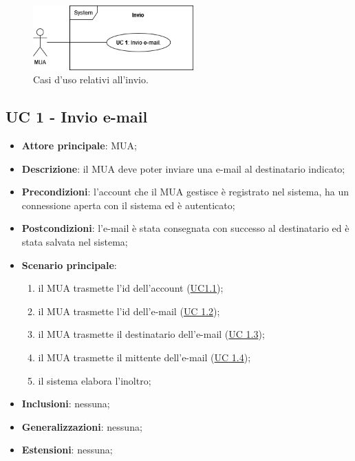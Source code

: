 
\begin{figure}[H]
    \includegraphics[width=0.55\textwidth]{sections/uc_imgs/UC-invio.png}
    \centering
    \caption{Casi d'uso relativi all'invio.}
\end{figure}

\subsection{UC 1 - Invio e-mail} \label{sec:UC1}
    
    \begin{itemize}
        \item \textbf{Attore principale}: MUA;
        \item \textbf{Descrizione}: il MUA deve poter inviare una e-mail al destinatario indicato;
        \item \textbf{Precondizioni}: l’account che il MUA gestisce è registrato nel sistema, ha un connessione aperta con il sistema ed è autenticato;
        \item \textbf{Postcondizioni}: l'e-mail è stata consegnata con successo al destinatario ed è stata salvata nel sistema;
        \item \textbf{Scenario principale}:
            \begin{enumerate}
                \item il MUA trasmette l'id dell'account (\hyperref[sec:UC1.1]{UC1.1});
                \item il MUA trasmette l'id dell'e-mail (\hyperref[sec:UC1.2]{UC 1.2});
                \item il MUA trasmette il destinatario dell'e-mail (\hyperref[sec:UC1.3]{UC 1.3});
                \item il MUA trasmette il mittente dell'e-mail (\hyperref[sec:UC1.4]{UC 1.4});
                \item il sistema elabora l'inoltro;
            \end{enumerate}
        \item \textbf{Inclusioni}: nessuna;
        \item \textbf{Generalizzazioni}: nessuna;
        \item \textbf{Estensioni}: nessuna;
    \end{itemize}

